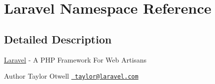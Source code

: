 \hypertarget{namespace_laravel}{}\section{Laravel Namespace Reference}
\label{namespace_laravel}


\subsection{Detailed Description}
\mbox{\hyperlink{namespace_laravel}{Laravel}} -\/ A P\+HP Framework For Web Artisans

\begin{DoxyAuthor}{Author}
Taylor Otwell \href{mailto:taylor@laravel.com}{\texttt{ taylor@laravel.\+com}} 
\end{DoxyAuthor}
